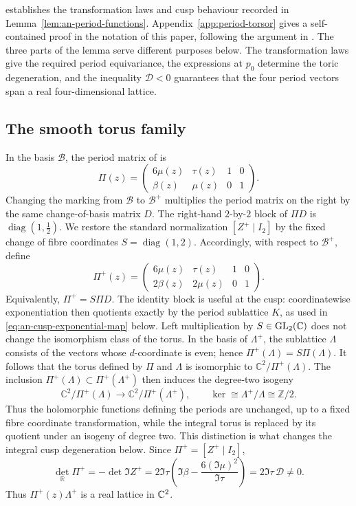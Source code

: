 \citet[Theorem~3.4]{Alpoge2026} establishes the transformation laws and cusp
behaviour recorded in Lemma~\ref{lem:an-period-functions}.
Appendix~\ref{app:period-torsor} gives a self-contained proof in the notation
of this paper, following the argument in
\citep[Sections~3.1--3.4]{Alpoge2026}.
The three parts of the lemma serve different purposes below.  The
transformation laws give the required period equivariance, the expressions
at $p_0$ determine the toric degeneration, and the inequality
$\mathcal D<0$ guarantees that the four period vectors span a real
four-dimensional lattice.

\subsection{The smooth torus family}

In the basis $\mathcal B$, the period matrix of
\citep[Definition~3.3]{Alpoge2026} is
\[
 \Pi(z)=
 \begin{pmatrix}
  6\mu(z)&\tau(z)&1&0\\
  \beta(z)&\mu(z)&0&1
 \end{pmatrix}.
\]
Changing the marking from $\mathcal B$ to $\mathcal B^+$ multiplies the
period matrix on the right by the same change-of-basis matrix $D$.
The right-hand $2$-by-$2$ block of $\Pi D$ is
$\operatorname{diag}(1,\tfrac12)$.  We restore the standard normalization
$[Z^+\mid I_2]$ by the fixed change of fibre coordinates
$S=\operatorname{diag}(1,2)$.  Accordingly, with respect to
$\mathcal B^+$, define
\begin{equation}\label{eq:an-period-matrix}
 \Pi^+(z)=
 \begin{pmatrix}
 6\mu(z)&\tau(z)&1&0\\
 2\beta(z)&2\mu(z)&0&1
 \end{pmatrix}.
\end{equation}
Equivalently, $\Pi^+=S\Pi D$.
The identity block is useful at the cusp: coordinatewise exponentiation then
quotients exactly by the period sublattice $K$, as used in
\eqref{eq:an-cusp-exponential-map} below.
Left multiplication by $S\in\operatorname{GL}_2(\mathbb C)$ does not change the
isomorphism class of the torus.  In the basis of $\Lambda^+$, the
sublattice $\Lambda$ consists of the vectors whose $d$-coordinate is
even; hence $\Pi^+(\Lambda)=S\Pi(\Lambda)$.  It follows that the torus
defined by $\Pi$ and $\Lambda$ is isomorphic to
$\mathbb C^2/\Pi^+(\Lambda)$.  The inclusion
$\Pi^+(\Lambda)\subset\Pi^+(\Lambda^+)$ then induces the degree-two
isogeny
\[
 \mathbb C^2/\Pi^+(\Lambda)
 \longrightarrow \mathbb C^2/\Pi^+(\Lambda^+),
 \qquad
 \ker\cong\Lambda^+/\Lambda\cong\mathbb Z/2.
\]
Thus the holomorphic functions defining the periods are unchanged, up to a
fixed fibre coordinate transformation, while the integral torus is replaced
by its quotient under an isogeny of degree two.  This distinction is what
changes the integral cusp degeneration below.  Since
$\Pi^+=[Z^+\mid I_2]$,
\begin{equation*}
 \det_{\mathbb R}\Pi^+
 =-\det\Im Z^+
 =2\Im\tau
   \left(\Im\beta-\frac{6(\Im\mu)^2}{\Im\tau}\right)
 =2\Im\tau\,\mathcal D\ne0.
\end{equation*}
Thus $\Pi^+(z)\Lambda^+$ is a real lattice in $\mathbb C^2$.

